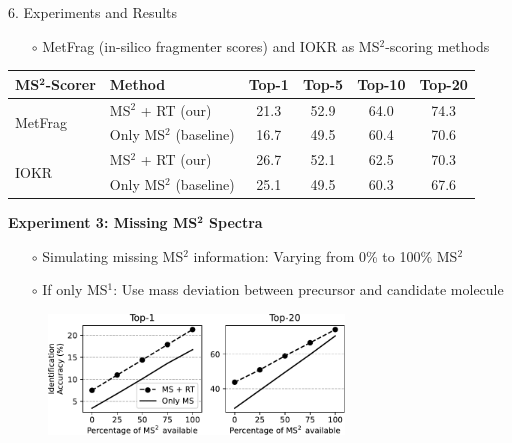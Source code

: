 \documentclass{beamer}
\newcommand{\ms}{MS}
\newcommand{\msone}{\ms$^1$}
\newcommand{\msms}{\ms$^2$}
\begin{document}
\begin{frame}{}
\begin{columns}[T]
\begin{block}{{\normalsize 6. Experiments and Results}}
    \begin{itemize}
        \item[$\circ$] MetFrag (in-silico fragmenter scores) and IOKR \cite{Brouard_ismb_2016} as \msms{}-scoring methods
    \end{itemize}
        \begin{table}
            \centering
            \begin{tabular}{llcccc}
                \toprule
                {\bf \ms$^\mathbf{2}$-Scorer} & {\bf Method} & {\bf Top-1} & {\bf Top-5} & {\bf Top-10} & {\bf Top-20} \\ 
                \midrule
                    \multirow{2}{*}{MetFrag} &  \msms{} + RT (our) &   21.3 &   52.9 &    64.0 &    74.3 \\
                                             &  Only \msms{} (baseline) &   16.7 &   49.5 &    60.4 &    70.6 \\
                    \cmidrule(lr){1-6}
                    \multirow{2}{*}{IOKR} &  \msms{} + RT (our) &   26.7 &   52.1 &    62.5 &    70.3 \\
                                          &  Only \msms{} (baseline)&   25.1 &   49.5 &    60.3 &    67.6 \\
                \bottomrule
            \end{tabular}
        \end{table}
    \vspace{1cm}
    \textbf{Experiment 3: Missing \ms$^\mathbf{2}$ Spectra}
    \begin{itemize}
        \item[$\circ$] Simulating missing \msms{} information: Varying from 0\% to 100\% \msms
        \item[$\circ$] If only \msone{}: Use mass deviation between precursor and candidate molecule
    \end{itemize}
    \begin{figure}
        \centering
        \includegraphics[width=0.7\textwidth]{images/missing_ms2.pdf}
    \end{figure}
    \vspace{-0.75cm}
    \end{block}


\end{columns}
\end{frame}
\end{document}
